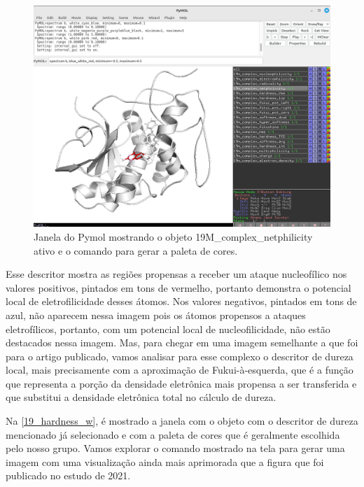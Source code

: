 \documentclass[a4paper,11pt]{refart}
\begin{document}
	\hspace*{-\leftmarginwidth}
	\begin{minipage}{\fullwidth}
		\begin{figure}[H]
			\begin{center}
				\includegraphics[width=5in]{pymol_window3}
				\caption{Janela do Pymol mostrando o objeto 19M\_complex\_netphilicity ativo e o comando para gerar a paleta de cores.}
				\label{fig_tut3_6}
			\end{center}
		\end{figure}
	\end{minipage}

	Esse descritor mostra as regiões propensas a receber um ataque nucleofílico nos valores positivos, pintados em tons de vermelho, portanto demonstra o potencial local de eletrofilicidade desses átomos. Nos valores negativos, pintados em tons de azul, não aparecem nessa imagem pois os átomos propensos a ataques eletrofílicos, portanto, com um potencial local de nucleofilicidade, não estão destacados nessa imagem. Mas, para chegar em uma imagem semelhante a que foi para o artigo publicado, vamos analisar para esse complexo o descritor de dureza local, mais precisamente com a aproximação de Fukui-à-esquerda, que é a função que representa a porção da densidade eletrônica mais propensa a ser transferida e que substitui a densidade eletrônica total no cálculo de dureza. 
	
	Na \autoref{19_hardness_w}, é mostrado a janela com o objeto com o descritor de dureza mencionado já selecionado e com a paleta de cores que é geralmente escolhida pelo nosso grupo. Vamos explorar o comando mostrado na tela para gerar uma imagem com uma visualização ainda mais aprimorada que a figura que foi publicado no estudo de 2021.
	
\end{document}
